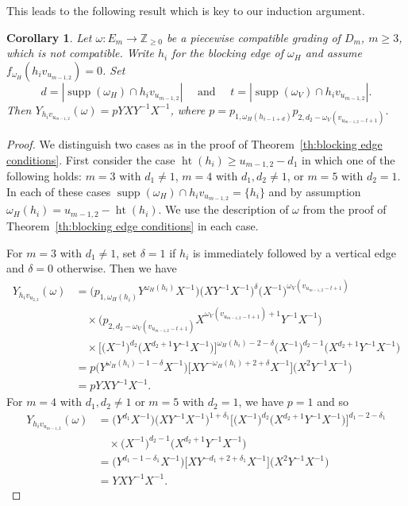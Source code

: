 \documentclass[10pt]{amsart}
\newtheorem{corollary}[theorem]{Corollary}
\theoremstyle{definition}
\newcommand{\ZZ}{\mathbb{Z}}
\DeclareMathOperator{\hgt}{ht}
\DeclareMathOperator{\supp}{supp}
\begin{document}
This leads to the following result which is key to our induction argument.
\begin{corollary}
 \label{cor:incompatible collapse}
 Let $\omega:E_m\to\ZZ_{\ge0}$ be a piecewise compatible grading of $D_m$, $m\ge3$, which is not compatible. 
 Write $h_i$ for the blocking edge of $\omega_H$ and assume $f_{\omega_H}(h_iv_{u_{m-1,2}})=0$. 
 Set 
 \[d=|\supp(\omega_H)\cap h_iv_{u_{m-1,2}}|\quad\text{ and }\quad t=|\supp(\omega_V)\cap h_iv_{u_{m-1,2}}|.\]
 Then $Y_{h_iv_{u_{m-1,2}}}(\omega)=pYXY^{-1}X^{-1}$, where $p=p_{1,\omega_H(h_{i-1+d})}p_{2,d_2-\omega_V(v_{u_{m-1,2}-t+1})}$.
\end{corollary}
\begin{proof}
 We distinguish two cases as in the proof of Theorem~\ref{th:blocking edge conditions}.
 First consider the case $\hgt(h_i)\ge u_{m-1,2}-d_1$ in which one of the following holds: $m=3$ with $d_1\ne1$, $m=4$ with $d_1,d_2\ne1$, or $m=5$ with $d_2=1$.
 In each of these cases $\supp(\omega_H)\cap h_iv_{u_{m-1,2}}=\{h_i\}$ and by assumption $\omega_H(h_i)=u_{m-1,2}-\hgt(h_i)$.
 We use the description of $\omega$ from the proof of Theorem~\ref{th:blocking edge conditions} in each case.

 For $m=3$ with $d_1\ne1$, set $\delta=1$ if $h_i$ is immediately followed by a vertical edge and $\delta=0$ otherwise. 
 Then we have
 \begin{align*}
 Y_{h_iv_{u_{2,2}}}(\omega)
 &=\big(p_{1,\omega_H(h_i)}Y^{\omega_H(h_i)} X^{-1}\big)\big(XY^{-1}X^{-1}\big)^\delta\big(X^{-1}\big)^{\omega_V(v_{u_{m-1,2}-t+1})}\\
 &\quad\times\big(p_{2,d_2-\omega_V(v_{u_{m-1,2}-t+1})}X^{\omega_V(v_{u_{m-1,2}-t+1})+1}Y^{-1}X^{-1}\big)\\
 &\quad\times\Big[\big(X^{-1}\big)^{d_2}\big(X^{d_2+1}Y^{-1}X^{-1}\big)\Big]^{\omega_H(h_i)-2-\delta}\big(X^{-1}\big)^{d_2-1}\big(X^{d_2+1}Y^{-1}X^{-1}\big)\\
 &=p\big(Y^{\omega_H(h_i)-1-\delta}X^{-1}\big)\Big[XY^{-\omega_H(h_i)+2+\delta}X^{-1}\Big]\big(X^2Y^{-1}X^{-1}\big)\\
 &=pYXY^{-1}X^{-1}.
 \end{align*}
 For $m=4$ with $d_1,d_2\ne1$ or $m=5$ with $d_2=1$, we have $p=1$ and so
 \begin{align*}
 Y_{h_iv_{u_{m-1,2}}}(\omega)
 &=\big(Y^{d_1}X^{-1}\big)\big(XY^{-1}X^{-1}\big)^{1+\delta_1}\Big[\big(X^{-1}\big)^{d_2}\big(X^{d_2+1}Y^{-1}X^{-1}\big)\Big]^{d_1-2-\delta_1}\\
 &\quad\times\big(X^{-1}\big)^{d_2-1}\big(X^{d_2+1}Y^{-1}X^{-1}\big)\\
 &=\big(Y^{d_1-1-\delta_1}X^{-1}\big)\Big[XY^{-d_1+2+\delta_1}X^{-1}\Big]\big(X^2Y^{-1}X^{-1}\big)\\
 &=YXY^{-1}X^{-1}.
 \end{align*}


\end{proof}
\end{document}
